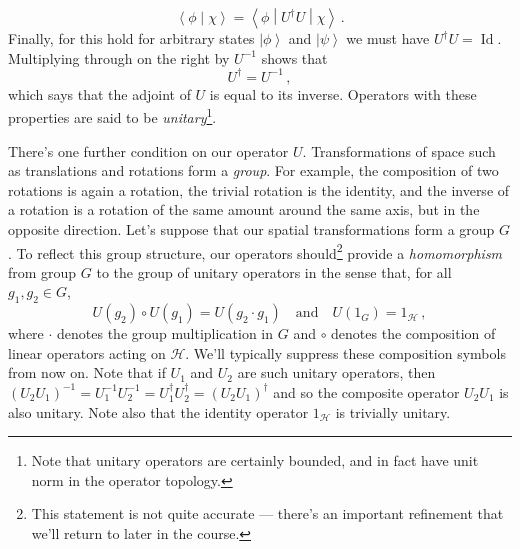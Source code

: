 \documentclass{article}
\theoremstyle{plain}\theoremheaderfont{\normalfont\itshape}\theorembodyfont{\rmfamily}\theoremseparator{.}\newtheorem*{rem}{Remark}\newtheorem*{ex}{Example}\newtheorem*{proof}{Proof}\newtheorem*{altp}{Alternative proof}
\theoremstyle{plain}\theoremheaderfont{\normalfont\bfseries}\theorembodyfont{\rmfamily}\theoremseparator{.}\newtheorem{thm}{Theorem}[section]\newtheorem{lem}[thm]{Lemma}\newtheorem{prop}[thm]{Proposition}\newtheorem*{cor}{Corollary}\newtheorem{defn}[thm]{Definition}\newtheorem{clm}[thm]{Claim}\newtheorem{clminproof}{Claim}
\theoremstyle{break}\theoremheaderfont{\normalfont\itshape}\theorembodyfont{\rmfamily}\theoremseparator{.\medskip}\newtheorem*{proofskip}{Proof}\newtheorem*{exs}{Examples}\newtheorem*{rems}{Remarks}
\theoremstyle{break}\theoremheaderfont{\normalfont\bfseries}\theorembodyfont{\rmfamily}\theoremseparator{.\medskip}\newtheorem{lemskip}[thm]{Lemma}\newtheorem{defnskip}[thm]{Definition}\newtheorem{propskip}[thm]{Proposition}\newtheorem{thmskip}[thm]{Theorem}
\numberwithin{equation}{section}
\newcommand{\ket}[1]{\left| #1 \right\rangle}
\newcommand{\braket}[2]{\left\langle #1 \middle| #2 \right\rangle}
\newcommand{\mel}[3]{\left\langle #1 \middle| #2 \middle| #3 \right\rangle}
\newcommand{\hb}{\mathcal{H}}
\DeclareMathOperator{\Id}{Id}
\begin{document}
    \begin{equation}
        \braket{\phi}{\chi}=\mel{\phi}{U^\dagger U}{\chi}\,.
    \end{equation}
    Finally, for this hold for arbitrary states \(\ket{\phi}\) and \(\ket{\psi}\) we must have \(U^\dagger U=\Id\). Multiplying through on the right by \(U^{-1}\) shows that
    \begin{equation}\label{unitary_transformation}
        U^\dagger=U^{-1}\,,
    \end{equation}
    which says that the adjoint of \(U\) is equal to its inverse. Operators with these properties are said to be \textit{unitary}\footnote{Note that unitary operators are certainly bounded, and in fact have unit norm in the operator topology.}.

    There's one further condition on our operator \(U\). Transformations of space such as translations and rotations form a \textit{group}. For example, the composition of two rotations is again a rotation, the trivial rotation is the identity, and the inverse of a rotation is a rotation of the same amount around the same axis, but in the opposite direction. Let's suppose that our spatial transformations form a group \(G\). To reflect this group structure, our operators should\footnote{This statement is not quite accurate --- there's an important refinement that we'll return to later in the course.} provide a \textit{homomorphism} from group \(G\) to the group of unitary operators in the sense that, for all \(g_1,g_2\in G\),
    \begin{equation}\label{homomorphism}
        U(g_2)\circ U(g_1)=U(g_2\cdot g_1)\quad\text{and}\quad U(1_G)=1_\hb\,,
    \end{equation}
    where \(\cdot\) denotes the group multiplication in \(G\) and \(\circ\) denotes the composition of linear operators acting on \(\hb\). We'll typically suppress these composition symbols from now on. Note that if \(U_1\) and \(U_2\) are such unitary operators, then \((U_2U_1)^{-1}=U_1^{-1}U_2^{-1}=U_1^\dagger U_2^\dagger=(U_2 U_1)^\dagger\) and so the composite operator \(U_2U_1\) is also unitary. Note also that the identity operator \(1_\hb\) is trivially unitary.
\end{document}
